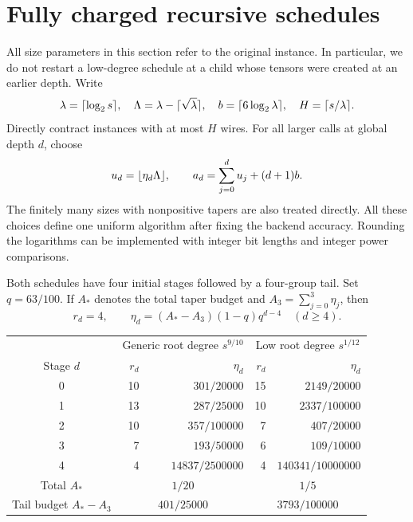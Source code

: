 \section{Fully charged recursive schedules}\label{sec:schedules}

All size parameters in this section refer to the original instance. In
particular, we do not restart a low-degree schedule at a child whose
tensors were created at an earlier depth. Write
\[
 \lambda=\lceil\log_2s\rceil,\quad
 \Lambda=\lambda-\lceil\sqrt\lambda\rceil,\quad
 b=\lceil6\log_2\lambda\rceil,\quad H=\lceil s/\lambda\rceil.
\]
Directly contract instances with at most $H$ wires. For all larger calls
at global depth $d$, choose
\begin{equation}\label{eq:integer-schedule}
 u_d=\lfloor\eta_d\Lambda\rfloor,\qquad
 a_d=\sum_{j=0}^d u_j+(d+1)b.
\end{equation}
The finitely many sizes with nonpositive tapers are also treated directly.
All these choices define one uniform algorithm after fixing the backend
accuracy. Rounding the logarithms can be implemented with integer bit
lengths and integer power comparisons.

Both schedules have four initial stages followed by a four-group tail.
Set $q=63/100$. If $A_*$ denotes the total taper budget and
$A_3=\sum_{j=0}^3\eta_j$, then
\begin{equation}\label{eq:tail-taper}
 r_d=4,\qquad \eta_d=(A_*-A_3)(1-q)q^{d-4}\quad(d\ge4).
\end{equation}

\begin{center}\small
\begin{tabular}{@{}crrrr@{}}
\toprule
 & \multicolumn{2}{c}{Generic root degree $s^{9/10}$}
 & \multicolumn{2}{c}{Low root degree $s^{1/12}$}\\
Stage $d$ & $r_d$ & $\eta_d$ & $r_d$ & $\eta_d$\\\midrule
0 & 10 & $301/20000$ & 15 & $2149/20000$\\
1 & 13 & $287/25000$ & 10 & $2337/100000$\\
2 & 10 & $357/100000$ & 7 & $407/20000$\\
3 & 7 & $193/50000$ & 6 & $109/10000$\\
4 & 4 & $14837/2500000$ & 4 & $140341/10000000$\\\midrule
Total $A_*$ & \multicolumn{2}{c}{$1/20$}
 & \multicolumn{2}{c}{$1/5$}\\
Tail budget $A_*-A_3$ & \multicolumn{2}{c}{$401/25000$}
 & \multicolumn{2}{c}{$3793/100000$}\\
\bottomrule
\end{tabular}
\end{center}

